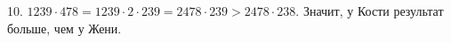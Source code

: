 10. $1239\cdot478=1239\cdot2\cdot239=2478\cdot239>2478\cdot238.$ Значит, у Кости результат больше, чем у Жени.\\
